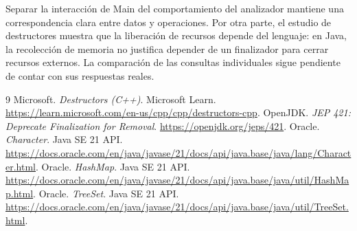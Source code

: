 \documentclass[letterpaper,12pt,oneside]{article}
\numberwithin{figure}{section}
\begin{document}
Separar la interacción de Main del comportamiento del analizador mantiene una correspondencia clara entre datos y operaciones. Por otra parte, el estudio de destructores muestra que la liberación de recursos depende del lenguaje: en Java, la recolección de memoria no justifica depender de un finalizador para cerrar recursos externos. La comparación de las consultas individuales sigue pendiente de contar con sus respuestas reales.

\begin{thebibliography}{9}
 Microsoft. \textit{Destructors (C++)}. Microsoft Learn. \url{https://learn.microsoft.com/en-us/cpp/cpp/destructors-cpp}.
 OpenJDK. \textit{JEP 421: Deprecate Finalization for Removal}. \url{https://openjdk.org/jeps/421}.
 Oracle. \textit{Character}. Java SE 21 API. \url{https://docs.oracle.com/en/java/javase/21/docs/api/java.base/java/lang/Character.html}.
 Oracle. \textit{HashMap}. Java SE 21 API. \url{https://docs.oracle.com/en/java/javase/21/docs/api/java.base/java/util/HashMap.html}.
 Oracle. \textit{TreeSet}. Java SE 21 API. \url{https://docs.oracle.com/en/java/javase/21/docs/api/java.base/java/util/TreeSet.html}.
\end{thebibliography}
\end{document}
